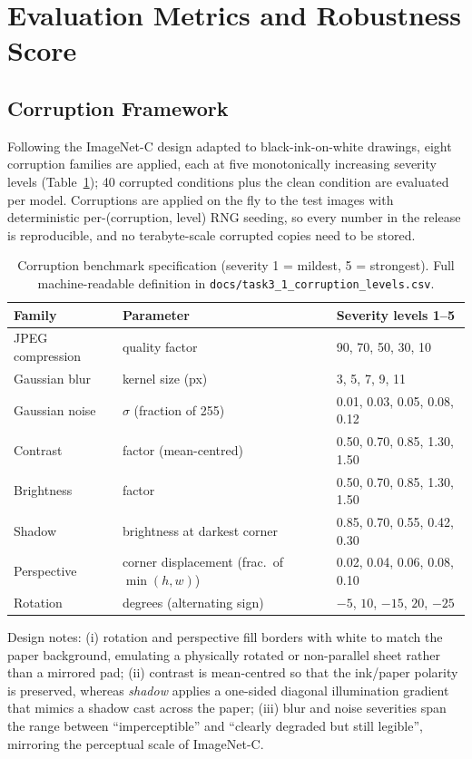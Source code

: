 \documentclass[11pt,a4paper]{article}
\begin{document}
\section{Evaluation Metrics and Robustness Score}
\label{sec:metrics}

\subsection{Corruption Framework}
\label{sec:framework}

Following the ImageNet-C design \cite{hendrycks2019} adapted to
black-ink-on-white drawings, eight corruption families are applied, each at five
monotonically increasing severity levels (Table~\ref{tab:corruptions});
40 corrupted conditions plus the clean condition are evaluated per model.
Corruptions are applied on the fly to the test images with deterministic
per-(corruption, level) RNG seeding, so every number in the release is
reproducible, and no terabyte-scale corrupted copies need to be stored.

\begin{table}[t]
\centering\small
\caption{Corruption benchmark specification (severity 1 = mildest,
5 = strongest). Full machine-readable definition in
\texttt{docs/task3\_1\_corruption\_levels.csv}.}
\label{tab:corruptions}
\begin{tabular}{lll}
\toprule
Family & Parameter & Severity levels 1--5 \\
\midrule
JPEG compression & quality factor & 90, 70, 50, 30, 10 \\
Gaussian blur & kernel size (px) & 3, 5, 7, 9, 11 \\
Gaussian noise & $\sigma$ (fraction of 255) & 0.01, 0.03, 0.05, 0.08, 0.12 \\
Contrast & factor (mean-centred) & 0.50, 0.70, 0.85, 1.30, 1.50 \\
Brightness & factor & 0.50, 0.70, 0.85, 1.30, 1.50 \\
Shadow & brightness at darkest corner & 0.85, 0.70, 0.55, 0.42, 0.30 \\
Perspective & corner displacement (frac.\ of $\min(h,w)$) & 0.02, 0.04, 0.06, 0.08, 0.10 \\
Rotation & degrees (alternating sign) & $-5$, $10$, $-15$, $20$, $-25$ \\
\bottomrule
\end{tabular}
\end{table}

Design notes: (i) rotation and perspective fill borders with white to match
the paper background, emulating a physically rotated or non-parallel sheet
rather than a mirrored pad; (ii) contrast is mean-centred so that the
ink/paper polarity is preserved, whereas \emph{shadow} applies a one-sided
diagonal illumination gradient that mimics a shadow cast across the paper;
(iii) blur and noise severities span the range between ``imperceptible'' and
``clearly degraded but still legible'', mirroring the perceptual scale of
ImageNet-C.
\end{document}
